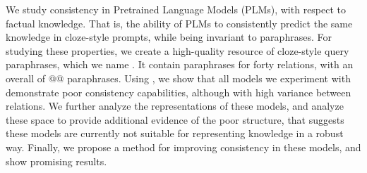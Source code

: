 We study consistency in Pretrained Language Models (PLMs), with respect to factual knowledge. That is, the ability of PLMs to consistently predict the same knowledge in cloze-style prompts, while being invariant to paraphrases.
For studying these properties, we create a high-quality resource of cloze-style query paraphrases, which we name \resource{}. It contain paraphrases for forty relations, with an overall of @@ paraphrases.
Using \resource{}, we show that all models we experiment with demonstrate poor consistency capabilities, although with high variance between relations.
We further analyze the representations of these models, and analyze these space to provide additional evidence of the poor structure, that suggests these models are currently not suitable for representing knowledge in a robust way.
Finally, we propose a method for improving consistency in these models, and show promising results.